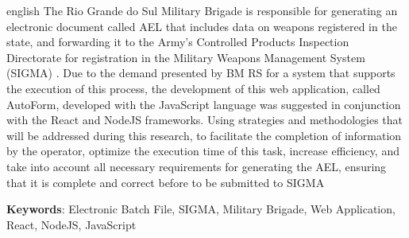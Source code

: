 \begin{resumo}[Abstract]
 \begin{otherlanguage*}{english}
  The Rio Grande do Sul Military Brigade is responsible for generating an electronic document called AEL that includes data on weapons registered in the state, and forwarding it to the Army's Controlled Products Inspection Directorate for registration in the Military Weapons Management System (SIGMA) . Due to the demand presented
by BM RS for a system that supports the execution of this process, the development of this web application, called AutoForm, developed with the JavaScript language was suggested
in conjunction with the React and NodeJS frameworks. Using strategies and methodologies
that will be addressed during this research, to facilitate the completion of information by the
operator, optimize the execution time of this task, increase efficiency, and take into account all
necessary requirements for generating the AEL, ensuring that it is complete and correct before
to be submitted to SIGMA

   \vspace{\onelineskip}
 
   \noindent 
   \textbf{Keywords}: Electronic Batch File, SIGMA, Military Brigade, Web Application, React, NodeJS, JavaScript%
 \end{otherlanguage*}
\end{resumo}